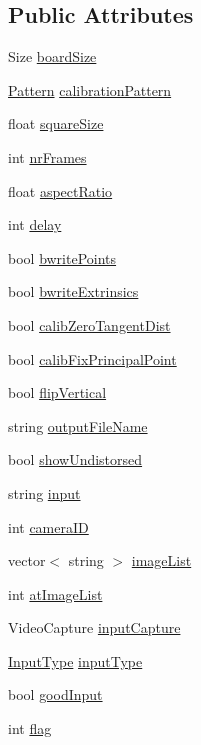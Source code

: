 \subsection*{Public Attributes}
\begin{DoxyCompactItemize}
\item 
Size \mbox{\hyperlink{classSettings_a5030a7164df923bb3b86dd7a0fc9af30}{board\+Size}}
\item 
\mbox{\hyperlink{classSettings_a0e7117abd9427a6f8bc1d1d8d456b5c8}{Pattern}} \mbox{\hyperlink{classSettings_a94551b7ffe8ac60311b035b2905e9498}{calibration\+Pattern}}
\item 
float \mbox{\hyperlink{classSettings_a6c94708776ad1ce258fc44f2101f5941}{square\+Size}}
\item 
int \mbox{\hyperlink{classSettings_a7e6654cd0e51791ed687eaa85f8fc143}{nr\+Frames}}
\item 
float \mbox{\hyperlink{classSettings_af55c910308a0d773055d0b19261bb3b8}{aspect\+Ratio}}
\item 
int \mbox{\hyperlink{classSettings_a5fe947366441009187d633f9e4663256}{delay}}
\item 
bool \mbox{\hyperlink{classSettings_ab4aac97bdb5696d60b35a29c26497064}{bwrite\+Points}}
\item 
bool \mbox{\hyperlink{classSettings_af1ac412d660e25aea698c76fa88de57c}{bwrite\+Extrinsics}}
\item 
bool \mbox{\hyperlink{classSettings_a4bc7ff147d74721a3587ce6fcb64ef32}{calib\+Zero\+Tangent\+Dist}}
\item 
bool \mbox{\hyperlink{classSettings_a44397eea3f08a0c78808c38bdd716594}{calib\+Fix\+Principal\+Point}}
\item 
bool \mbox{\hyperlink{classSettings_ab6304f260b315d2820f755e1c3a052b5}{flip\+Vertical}}
\item 
string \mbox{\hyperlink{classSettings_a9468f1ad53e982f9541d76c8d3228900}{output\+File\+Name}}
\item 
bool \mbox{\hyperlink{classSettings_a935d6f27ee454e9fee63f8b662f48a06}{show\+Undistorsed}}
\item 
string \mbox{\hyperlink{classSettings_a9970d51ab47b6560ab11b267637b6219}{input}}
\item 
int \mbox{\hyperlink{classSettings_af32a5ff06192bde106c934e0361bcd7e}{camera\+ID}}
\item 
vector$<$ string $>$ \mbox{\hyperlink{classSettings_ae261128a69d1d3d2b0f5315aff8066c8}{image\+List}}
\item 
int \mbox{\hyperlink{classSettings_a80061aedf354e63cb6c4c1fb7c4a9055}{at\+Image\+List}}
\item 
Video\+Capture \mbox{\hyperlink{classSettings_abd5706146b34d3c32aef4025dcd2ec1b}{input\+Capture}}
\item 
\mbox{\hyperlink{classSettings_a5afe85d24b071973a7f248c05386f7f4}{Input\+Type}} \mbox{\hyperlink{classSettings_a89fb14ce9856fb642f18bb0f7c5b8868}{input\+Type}}
\item 
bool \mbox{\hyperlink{classSettings_a3b9fc27b555f982bd5b9ea5198e1f7e3}{good\+Input}}
\item 
int \mbox{\hyperlink{classSettings_aba5691e3e76525f93ea254e654ec3717}{flag}}
\end{DoxyCompactItemize}
